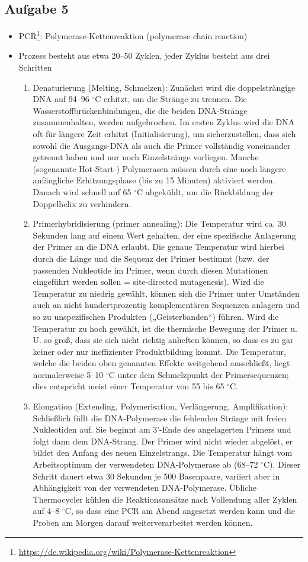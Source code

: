 \documentclass[13pt,a4paper]{article}
\begin{document}
\subsection{Aufgabe 5}
\begin{itemize}
	\item PCR\footnote{\url{https://de.wikipedia.org/wiki/Polymerase-Kettenreaktion}}: Polymerase-Kettenreaktion (polymerase chain reaction)
	\item Prozess besteht aus etwa 20–50 Zyklen, jeder Zyklus besteht aus drei Schritten
	\begin{enumerate}
		\item Denaturierung (Melting, Schmelzen): Zunächst wird die doppelsträngige DNA auf 94–96 $^\circ$C erhitzt, um die Stränge zu trennen. Die Wasserstoffbrückenbindungen, die die beiden DNA-Stränge zusammenhalten, werden aufgebrochen. Im ersten Zyklus wird die DNA oft für längere Zeit erhitzt (Initialisierung), um sicherzustellen, dass sich sowohl die Ausgangs-DNA als auch die Primer vollständig voneinander getrennt haben und nur noch Einzelstränge vorliegen. Manche (sogenannte Hot-Start-) Polymerasen müssen durch eine noch längere anfängliche Erhitzungsphase (bis zu 15 Minuten) aktiviert werden. Danach wird schnell auf 65 $^\circ$C abgekühlt, um die Rückbildung der Doppelhelix zu verhindern.
		\item Primerhybridisierung (primer annealing): Die Temperatur wird ca. 30 Sekunden lang auf einem Wert gehalten, der eine spezifische Anlagerung der Primer an die DNA erlaubt. Die genaue Temperatur wird hierbei durch die Länge und die Sequenz der Primer bestimmt (bzw. der passenden Nukleotide im Primer, wenn durch diesen Mutationen eingeführt werden sollen = site-directed mutagenesis). Wird die Temperatur zu niedrig gewählt, können sich die Primer unter Umständen auch an nicht hundertprozentig komplementären Sequenzen anlagern und so zu unspezifischen Produkten („Geisterbanden“) führen. Wird die Temperatur zu hoch gewählt, ist die thermische Bewegung der Primer u. U. so groß, dass sie sich nicht richtig anheften können, so dass es zu gar keiner oder nur ineffizienter Produktbildung kommt. Die Temperatur, welche die beiden oben genannten Effekte weitgehend ausschließt, liegt normalerweise 5–10 $^\circ$C unter dem Schmelzpunkt der Primersequenzen; dies entspricht meist einer Temperatur von 55 bis 65 $^\circ$C.
		\item Elongation (Extending, Polymerisation, Verlängerung, Amplifikation): Schließlich füllt die DNA-Polymerase die fehlenden Stränge mit freien Nukleotiden auf. Sie beginnt am 3'-Ende des angelagerten Primers und folgt dann dem DNA-Strang. Der Primer wird nicht wieder abgelöst, er bildet den Anfang des neuen Einzelstrangs. Die Temperatur hängt vom Arbeitsoptimum der verwendeten DNA-Polymerase ab (68–72 $^\circ$C). Dieser Schritt dauert etwa 30 Sekunden je 500 Basenpaare, variiert aber in Abhängigkeit von der verwendeten DNA-Polymerase. Übliche Thermocycler kühlen die Reaktionsansätze nach Vollendung aller Zyklen auf 4–8 $^\circ$C, so dass eine PCR am Abend angesetzt werden kann und die Proben am Morgen darauf weiterverarbeitet werden können.
	\end{enumerate}
\end{itemize}
\end{document}
